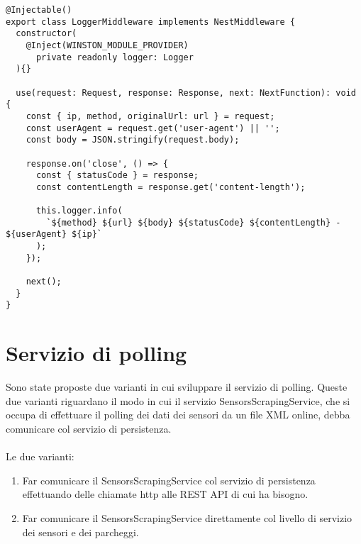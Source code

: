\begin{lstlisting}
@Injectable()
export class LoggerMiddleware implements NestMiddleware {
  constructor(
    @Inject(WINSTON_MODULE_PROVIDER)
      private readonly logger: Logger
  ){}

  use(request: Request, response: Response, next: NextFunction): void {
    const { ip, method, originalUrl: url } = request;
    const userAgent = request.get('user-agent') || '';
    const body = JSON.stringify(request.body);

    response.on('close', () => {
      const { statusCode } = response;
      const contentLength = response.get('content-length');

      this.logger.info(
        `${method} ${url} ${body} ${statusCode} ${contentLength} - ${userAgent} ${ip}`
      );
    });

    next();
  }
}
\end{lstlisting}

\section{Servizio di polling}
Sono state proposte due varianti in cui sviluppare il servizio di polling. Queste due varianti riguardano il
modo in cui il servizio SensorsScrapingService, che si occupa di effettuare il polling dei dati dei sensori
da un file XML online, debba comunicare col servizio di persistenza.
\\\\
Le due varianti:
\begin{enumerate}
    \item Far comunicare il SensorsScrapingService col servizio di persistenza effettuando delle chiamate http 
        alle REST API di cui ha bisogno.
    \item Far comunicare il SensorsScrapingService direttamente col livello di servizio dei sensori e dei parcheggi.
\end{enumerate}
\leavevmode\newline

